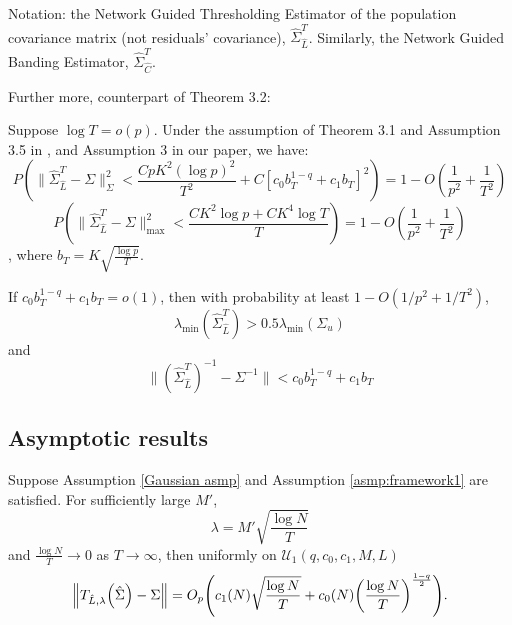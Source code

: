 Notation: the Network Guided Thresholding Estimator of the population covariance matrix (not residuals' covariance), $\hat \Sigma^T_{\hat L}$. Similarly, the Network Guided Banding Estimator, $\hat \Sigma^T_{\hat C}$.

Further more, counterpart of Theorem 3.2:
\begin{thm}
    Suppose $\log T = o(p)$. Under the assumption of Theorem 3.1 and Assumption 3.5 in 
    \cite{fanHighDimensionalCovarianceMatrix2011}, and Assumption 3 in our paper, we have:
    \[ P(\| \hat \Sigma_{\hat L}^T - \Sigma \|_\Sigma^2 < \frac{CpK^2(\log p)^2}{T^2} + C[c_0 b_T^{1-q} + c_1 b_T]^2 ) = 1 - O(\frac{1}{p^2} + \frac{1}{T^2}) \]
    \[ P( \| \hat \Sigma_{\hat L}^T - \Sigma \|_\max^2 < \frac{C K^2 \log p + C K^4 \log T}{T} ) = 1 - O(\frac{1}{p^2} + \frac{1}{T^2}) \]
    , where $b_T = K\sqrt{\frac{\log p}{T}}$.

     If $c_0 b_T^{1-q} + c_1 b_T = o(1)$, then with probability at least $1 - O(1/p^2 + 1/T^2)$, 
     \[ \lambda_\min (\hat \Sigma^T_{\hat L}) > 0.5 \lambda_\min (\Sigma_u) \]
     and
     \[ \| (\hat \Sigma_{\hat L}^T)^{-1} - \Sigma^{-1} \| < c_0 b_T^{1-q} + c_1 b_T \]
\end{thm}

\subsection{Asymptotic results}
\begin{thm}
    Suppose Assumption \autoref{Gaussian asmp} and Assumption \autoref{asmp:framework1} are satisfied. For sufficiently large \(M'\), 
    \begin{equation*}
        \lambda = M' \sqrt{\frac{\log N}{T}}
    \end{equation*}
    and \(\frac{\log N}{T} \to 0\) as \(T \to \infty\), 
    then uniformly on $\mathcal{U}_1 (q, c_{0}, c_{1}, M, L)$ 
    \begin{equation*}
    \norm{T_{\hat{L},\lambda}\pqty{\hat{\Sigma}} - \Sigma } = O_{p}\pqty{c_{1}(N) \sqrt{\frac{\log N}{T}}+c_{0}(N)\pqty{\frac{\log N}{T}}^{\frac{1-q}{2}}}.
    \end{equation*}
    \label{theorem1}
\end{thm}

